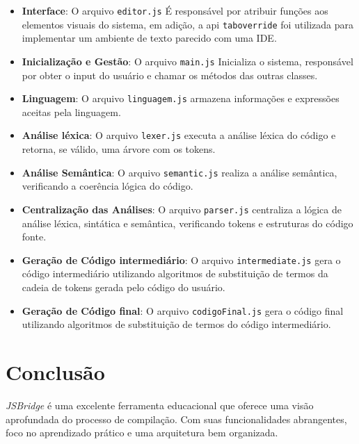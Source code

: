 \documentclass[a4paper,12pt]{article}
\begin{document}
\begin{itemize}
\item \textbf{Interface}: O arquivo \texttt{editor.js} É responsável por atribuir funções aos elementos visuais do sistema, em adição, a api \texttt{taboverride} foi utilizada para implementar um ambiente de texto parecido com uma IDE.
\item \textbf{Inicialização e Gestão}: O arquivo \texttt{main.js} Inicializa o sistema, responsável por obter o input do usuário e chamar os métodos das outras classes.
\item \textbf{Linguagem}: O arquivo \texttt{linguagem.js} armazena informações e expressões aceitas pela linguagem.
\item \textbf{Análise léxica}: O arquivo \texttt{lexer.js} executa a análise léxica do código e retorna, se válido, uma árvore com os tokens. 
\item \textbf{Análise Semântica}: O arquivo \texttt{semantic.js} realiza a análise semântica, verificando a coerência lógica do código.
\item \textbf{Centralização das Análises}: O arquivo \texttt{parser.js} centraliza a lógica de análise léxica, sintática e semântica, verificando tokens e estruturas do código fonte.
\item \textbf{Geração de Código intermediário}: O arquivo \texttt{intermediate.js} gera o código intermediário utilizando algoritmos de substituição de termos da cadeia de tokens gerada pelo código do usuário.
\item \textbf{Geração de Código final}: O arquivo \texttt{codigoFinal.js} gera o código final utilizando algoritmos de substituição de termos do código intermediário.
\end{itemize}

\section{Conclusão}

\textit{JSBridge} é uma excelente ferramenta educacional que oferece uma visão aprofundada do processo de compilação. Com suas funcionalidades abrangentes, foco no aprendizado prático e uma arquitetura bem organizada.
\end{document}

